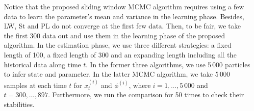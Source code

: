 Notice that the proposed sliding window MCMC algorithm requires using a few data to learn the parameter's mean and variance in the learning phase. Besides, LW, St and PL do not converge at the first few data. Then, to be fair, we take the first 300 data out and use them in the learning phase of the proposed algorithm. In the estimation phase, we use three different strategies: a fixed length of 100, a fixed length of 300 and an expanding length including all the historical data along time $t$. In the former three algorithms, we use 5\,000 particles to infer state and parameter. In the latter MCMC algorithm, we take 5\,000 samples at each time $t$ for  $x_t^{(i)}$ and $\phi^{(i)}$, where $i=1,\ldots,5\,000$ and $t=300,\ldots,897$. Furthermore, we run the comparison for 50 times to check their stabilities. 



